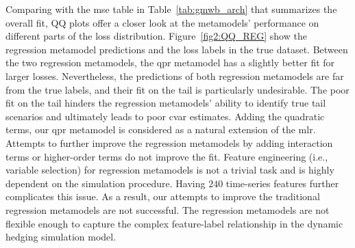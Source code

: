 Comparing with the \gls{mse} table in Table~\ref{tab:gmwb_arch} that summarizes the overall fit, QQ plots offer a closer look at the metamodels' performance on different parts of the loss distribution.
Figure~\ref{fig2:QQ_REG} show the regression metamodel predictions and the loss labels in the true dataset.
Between the two regression metamodels, the \gls{qpr} metamodel has a slightly better fit for larger losses.
Nevertheless, the predictions of both regression metamodels are far from the true labels, and their fit on the tail is particularly undesirable.
The poor fit on the tail hinders the regression metamodels' ability to identify true tail scenarios and ultimately leads to poor \gls{cvar} estimates.
Adding the quadratic terms, our \gls{qpr} metamodel is considered as a natural extension of the \gls{mlr}.
Attempts to further improve the regression metamodels by adding interaction terms or higher-order terms do not improve the fit.
Feature engineering (i.e., variable selection) for regression metamodels is not a trivial task and is highly dependent on the simulation procedure. 
Having $240$ time-series features further complicates this issue.
As a result, our attempts to improve the traditional regression metamodels are not successful.
The regression metamodels are not flexible enough to capture the complex feature-label relationship in the dynamic hedging simulation model.

